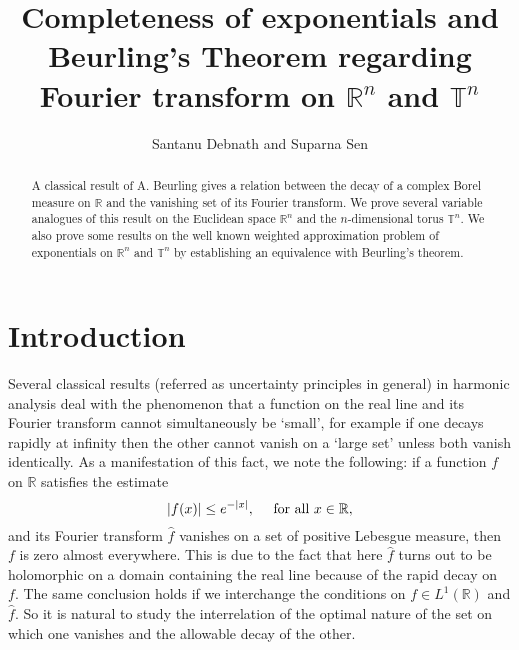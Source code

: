 \documentclass [11pt]{amsart}
\date{}
\newcommand{\R}{\mathbb R}
\newcommand{\T}{\mathbb T}
\newcommand{\txt} {\textmd}
\numberwithin{equation}{section}
\begin{document}
\title[\tiny{Completeness of exponentials and Beurling's Theorem on $\R^n$ and $\T^n$}]{Completeness of exponentials and Beurling's Theorem regarding Fourier transform on $\R^n$ and $\T^n$}

\author{\tiny{ Santanu Debnath and Suparna Sen}}

\address{Department of Pure Mathematics, University of Calcutta, India.}




\begin{abstract}
A classical result of A. Beurling gives a relation between the decay of a complex Borel measure on $\R$ and the vanishing set of its Fourier transform. We prove several variable analogues of this result on the Euclidean space $\R^n$ and the $n$-dimensional torus $\T^n.$ We also prove some results on the well known weighted approximation problem of exponentials on $\R^n$ and $\T^n$ by establishing an equivalence with Beurling's theorem. 
 \end{abstract}



\maketitle
\section{Introduction}

Several classical results (referred as uncertainty principles in general) in harmonic analysis  deal with the phenomenon that a function on the real line and its Fourier transform cannot simultaneously be `small', for example if one decays rapidly at infinity then the other cannot vanish on a `large set' unless both vanish identically. As a manifestation of this fact, we note the following: if a function $f$ on $\R$ satisfies the estimate 
$$ |f(x)| \leq e^{-|x|}, \quad \txt{ for all } x \in \R,$$
and its Fourier transform $\widehat{f}$ vanishes on a set of positive Lebesgue measure, then $f$ is zero almost everywhere. This is due to the fact that here $\widehat{f}$ turns out to be holomorphic on a domain containing the real line because of the rapid decay on $f.$ The same conclusion holds if we interchange the conditions on $f \in L^1(\R)$ and $\widehat{f}.$ So it is natural to study the interrelation of the optimal nature of the set on which one vanishes and the allowable decay of the other. 
\end{document}
